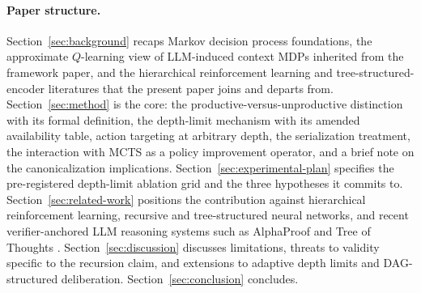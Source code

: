 \paragraph{Paper structure.}
Section~\ref{sec:background} recaps Markov decision process
foundations, the approximate $Q$-learning view of LLM-induced context
MDPs inherited from the framework paper, and the hierarchical
reinforcement learning and tree-structured-encoder literatures that
the present paper joins and departs from. Section~\ref{sec:method}
is the core: the productive-versus-unproductive distinction with its
formal definition, the depth-limit mechanism with its amended
availability table, action targeting at arbitrary depth, the
serialization treatment, the interaction with MCTS as a policy
improvement operator, and a brief note on the canonicalization
implications. Section~\ref{sec:experimental-plan} specifies the
pre-registered depth-limit ablation grid and the three hypotheses
it commits to. Section~\ref{sec:related-work} positions the
contribution against hierarchical reinforcement learning, recursive
and tree-structured neural networks, and recent verifier-anchored
LLM reasoning systems such as AlphaProof
\citep{deepmind2024alphaproof} and Tree of Thoughts
\citep{yao2023tree}. Section~\ref{sec:discussion} discusses
limitations, threats to validity specific to the recursion claim,
and extensions to adaptive depth limits and DAG-structured
deliberation. Section~\ref{sec:conclusion} concludes.
